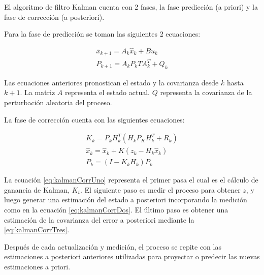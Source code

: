 El algoritmo de filtro Kalman cuenta con 2 fases, la fase predicción (a priori) y la fase de corrección (a posteriori).

Para la fase de predicción se toman las siguientes 2 ecuaciones:

\begin{eqnarray}
    \label{eq:kalmanActUno}
    \bar{x}_{k+1} = A_k\hat{x}_k + Bu_k\\
    \label{eq:kalmanActDos}
    P_{k+1} = A_kP_kTA^{T}_k + Q_k
\end{eqnarray}


Las ecuaciones anteriores pronostican el estado y la covarianza desde $k$ hasta $k+1$. La matriz $A$ representa el estado actual. $Q$ representa la covarianza de la perturbación aleatoria del proceso.

La fase de corrección cuenta con las siguientes ecuaciones:

\begin{eqnarray}
\label{eq:kalmanCorrUno}
K_k = P_kH^{T}_k(H_kP_KH^{T}_k + R_k)\\
\label{eq:kalmanCorrDos}
\hat{x}_k = \hat{x}_k + K(z_k - H_k \hat{x}_k)\\
\label{eq:kalmanCorrTres}
P_k = (I - K_kH_k)P_k
\end{eqnarray}

La ecuación \eqref{eq:kalmanCorrUno} representa el primer pasa el cual es el cálculo de ganancia de Kalman, $K_t$. El siguiente paso es medir el proceso para obtener $z$, y luego generar una estimación del estado a posteriori incorporando la medición como en la ecuación \eqref{eq:kalmanCorrDos}. El último paso es obtener una estimación de la covarianza del error a posteriori mediante la \eqref{eq:kalmanCorrTres}.

Después de cada actualización y medición, el proceso se repite con las estimaciones a posteriori anteriores utilizadas para proyectar o predecir las nuevas estimaciones a priori.

